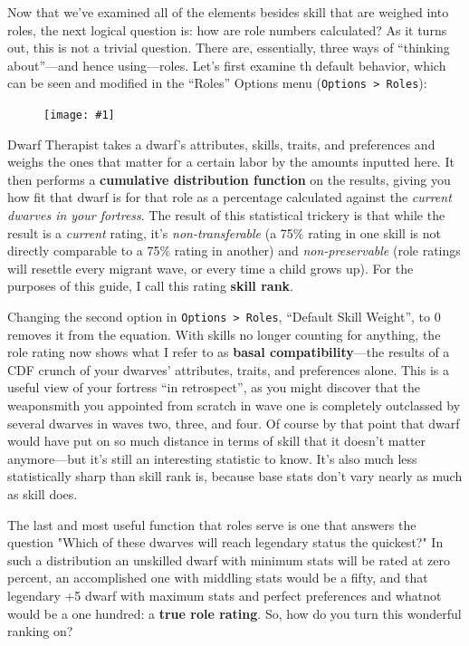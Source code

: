 \documentclass[]{article}
\newcommand{\fullfigure}[1] {
\begin{figure}[h!]
\texttt{[image: \#1]}
\end{figure}
}
\begin{document}
Now that we've examined all of the elements besides skill that are weighed into roles, the next logical
question is: how are role numbers calculated? As it turns out, this is not a trivial question.
There are, essentially, three ways of ``thinking about''---and hence using---roles. Let's first examine
th default behavior, which can be seen and modified in the ``Roles'' Options menu (\texttt{Options >
Roles}):
\fullfigure{Sec3Fig1}

\newpage
Dwarf Therapist takes a dwarf's attributes, skills, traits, and preferences and weighs the ones that
matter for a certain labor by the amounts inputted here. It then performs a \textbf{cumulative
distribution function} on the results, giving you how fit that dwarf is for that role as a percentage
calculated against the \emph{current dwarves in your fortress}. The result of this statistical trickery
is that while the result is a \emph{current} rating, it's \emph{non-transferable} (a 75\% rating in one
skill is not directly comparable to a 75\% rating in another) and \emph{non-preservable} (role ratings
will resettle every migrant wave, or every time a child grows up). For the purposes of this guide, I call
this rating \textbf{skill rank}.

Changing the second option in \texttt{Options > Roles}, ``Default Skill Weight'', to 0 removes it from the
equation. With skills no longer counting for anything, the role rating now shows what I refer to as
\textbf{basal compatibility}---the results of a CDF crunch of your dwarves' attributes, traits, and
preferences alone. This is a useful view of your fortress ``in retrospect'', as you might discover that the
weaponsmith you appointed from scratch in wave one is completely outclassed by several dwarves in waves
two, three, and four. Of course by that point that dwarf would have put on so much distance in terms of
skill that it doesn't matter anymore---but it's still an interesting statistic to know. It's also much
less statistically sharp than skill rank is, because base stats don't vary nearly as much as skill does.

The last and most useful function that roles serve is one that answers the question "Which of these
dwarves will reach legendary status the quickest?" In such a distribution an unskilled dwarf with minimum
stats will be rated at zero percent, an accomplished one with middling stats would be a fifty, and that
legendary +5 dwarf with maximum stats and perfect preferences and whatnot would be a one hundred: a
\textbf{true role rating}. So, how do you turn this wonderful ranking on?
\end{document}
